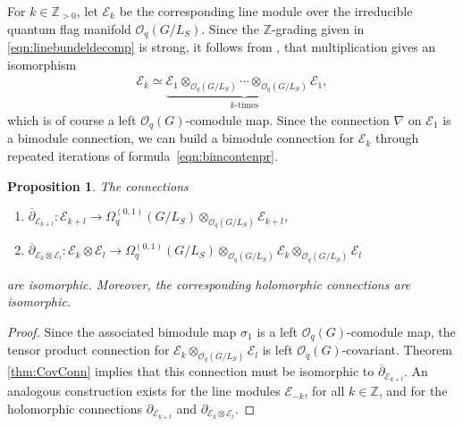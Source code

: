 \documentclass[pdftex]{sigma}
\numberwithin{equation}{section}
\newtheorem{prop}[Theorem]{Proposition}
 { \theoremstyle{definition}
\newtheorem{defn}[Theorem]{Definition}
\newtheorem{Note}[Theorem]{Note}
\newtheorem{eg}[Theorem]{Example}
\newtheorem{Remark}[Theorem]{Remark} }
\newcommand\del{\partial}
\newcommand\adel{\overline{\partial}}
\begin{document}
For $k \in \mathbb{Z}_{>0}$, let $\mathcal{E}_k$ be the corresponding line module over the irreducible quantum flag manifold $\mathcal{O}_q(G/L_S)$. Since the \mbox{$\mathbb{Z}$-grading} given in \eqref{eqn:linebundeldecomp} is strong, it follows from \cite[Corollary 3.1]{FreddyO}, that multiplication gives an isomorphism
\begin{align*}
\mathcal{E}_k \simeq \underbrace{\mathcal{E}_1 \otimes_{\mathcal{O}_q(G/L_S)} \cdots \otimes_{\mathcal{O}_q(G/L_S)} \mathcal{E}_1}_{k\text{-times}},
\end{align*}
which is of course a left $\mathcal{O}_q(G)$-comodule map. Since the connection $\nabla$ on $\mathcal{E}_1$ is a bimodule connection, we can build a bimodule connection for $\mathcal{E}_k$ through repeated iterations of formula~\eqref{eqn:bimcontenpr}.

\begin{prop}The connections
\begin{enumerate}\itemsep=0pt
\item[$(1)$] $\adel_{\mathcal{E}_{k + l}}\colon \mathcal{E}_{k + l} \to \Omega^{(0,1)}_q(G/L_S) \otimes_{\mathcal{O}_q(G/L_S)} \mathcal{E}_{k +l}$,
\item[$(2)$] $\adel_{\mathcal{E}_{k} \otimes \mathcal{E}_l}\colon \mathcal{E}_k \otimes \mathcal{E}_l \to \Omega^{(0,1)}_q(G/L_S) \otimes_{\mathcal{O}_q(G/L_S)} \mathcal{E}_k \otimes_{\mathcal{O}_q(G/L_S)} \mathcal{E}_l$
\end{enumerate}
are isomorphic. Moreover, the corresponding holomorphic connections are isomorphic.
\end{prop}
\begin{proof}Since the associated bimodule map $\sigma_1$ is a left $\mathcal{O}_q(G)$-comodule map, the tensor product connection for $\mathcal{E}_k \otimes_{\mathcal{O}_q(G/L_S)} \mathcal{E}_l$ is left $\mathcal{O}_q(G)$-covariant. Theorem \ref{thm:CovConn} implies that this connection must be isomorphic to $\adel_{\mathcal{E}_{k+l}}$. An analogous construction exists for the line modules $\mathcal{E}_{-k}$, for all $k \in \mathbb{Z}$, and for the holomorphic connections $\del_{\mathcal{E}_{k+l}}$ and $\del_{\mathcal{E}_{k} \otimes \mathcal{E}_l}$.
\end{proof}
\end{document}
